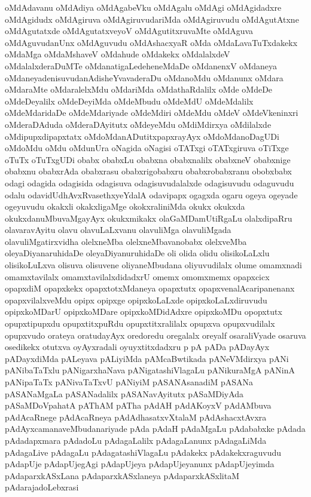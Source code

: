 {oMdAdavanu
oMdAdiya
oMdAgabeVku
oMdAgalu
oMdAgi
oMdAgidadxre
oMdAgidudx
oMdAgiruva
oMdAgiruvudariMda
oMdAgiruvudu
oMdAgutAtxne
oMdAgutatxde
oMdAgutatxveyoV
oMdAgutitxruvaMte
oMdAguva
oMdAguvudanUnx
oMdAguvudu
oMdAshacxyaR
oMda
oMdaLavaTuTxdakekx
oMdaMga
oMdaMshaveV
oMdahude
oMdakekx
oMdalalxdeV
oMdalalxderaDuMTe
oMdanatigaLedeheneMdaDe
oMdanenxV
oMdaneya
oMdaneyadenisuvudanAdisheYvavaderaDu
oMdanoMdu
oMdanunx
oMdara
oMdaraMte
oMdaralelxMdu
oMdariMda
oMdathaRdalilx
oMde
oMdeDe
oMdeDeyalilx
oMdeDeyiMda
oMdeMbudu
oMdeMdU
oMdeMdalilx
oMdeMdaridaDe
oMdeMdariyade
oMdeMdiri
oMdeMdu
oMdeV
oMdeVkeninxri
oMderaDAduda
oMderaDAyitutx
oMdeyeMdu
oMdiMdirxya
oMdilalxde
oMdipupxdipapxtatx
oMdoMdanADutitxpapxrayAyx
oMdoMdanoDagUDi
oMdoMdu
oMdu
oMdunUra
oNagida
oNagisi
oTATxgi
oTATxgiruva
oTiTxge
oTuTx
oTuTxgUDi
obabx
obabxLu
obabxna
obabxnalilx
obabxneV
obabxnige
obabxnu
obabxrAda
obabxrasu
obabxrigobabxru
obabxrobabxranu
obobxbabx
odagi
odagida
odagisida
odagisuva
odagisuvudalalxde
odagisuvudu
odaguvudu
odalu
odavidUdhAvxRvasethxyeYdalA
odavipapx
ogagxda
ogaru
ogeya
ogeyade
ogeyuvudu
okakxli
okakxligaMge
okokxraliniMda
okukx
okukxda
okukxdanuMbuvaMgayAyx
okukxmikakx
olaGaMDamUtiRgaLu
olalxdipaRru
olavaravAyitu
olavu
olavuLaLxvanu
olavuliMga
olavuliMgada
olavuliMgatirxvidha
olelxneMba
olelxneMbavanobabx
olelxveMba
oleyaDiyanaruhidaDe
oleyaDiyanuruhidaDe
oli
olida
olidu
olisikoLaLxlu
olisikoLuLxva
olisuva
olisuvene
oliyaneMbudana
oliyuvudilalx
olume
omamxnadi
omamxtavilalx
omamxtavilalxdidadxrU
omemx
omomxmemx
opapxcicx
opapxdiM
opapxkekx
opapxtotxMdaneya
opapxtutx
opapxvenalAcaripanenanx
opapxvilalxveMdu
opipx
opipxge
opipxkoLaLxde
opipxkoLaLxdiruvudu
opipxkoMDarU
opipxkoMDare
opipxkoMDidAdxre
opipxkoMDu
opopxtutx
opupxtipupxdu
opupxtitxpuRdu
opupxtitxralilalx
opupxva
opupxvudilalx
opupxvudo
orateya
oratudayAyx
oredoredu
oregalalx
oreyalf
osaraliVyade
osaruva
osedikekx
otutxva
oyAyxradali
oyuyxtitxdadxru
p
pA
pADa
pADayAyx
pADayxdiMda
pALeyava
pALiyiMda
pAMcaBwtikada
pANeVMdirxya
pANi
pANibaTaTxlu
pANigarxhaNava
pANigatashiVlagaLu
pANikuraMgA
pANinA
pANipaTaTx
pANivaTaTxvU
pANiyiM
pASANAsanadiM
pASANa
pASANaMgaLa
pASANadalilx
pASANavAyitutx
pASaMDiyAda
pASaMDoVpahatA
pAThAM
pATha
pAdAH
pAdAKoyxV
pAdAMbuva
pAdAcaRnege
pAdAcaRneya
pAdAdhasatxvXtalaM
pAdAshacxtAvxra
pAdAyxcamanaveMbudanariyade
pAda
pAdaH
pAdaMgaLu
pAdababxke
pAdada
pAdadapxmara
pAdadoLu
pAdagaLalilx
pAdagaLanunx
pAdagaLiMda
pAdagaLive
pAdagaLu
pAdagatashiVlagaLu
pAdakekx
pAdakekxraguvudu
pAdapUje
pAdapUjegAgi
pAdapUjeya
pAdapUjeyanunx
pAdapUjeyimda
pAdaparxkASxLana
pAdaparxkASxlaneya
pAdaparxkASxlitaM
pAdarajadoLebxrasi
}

